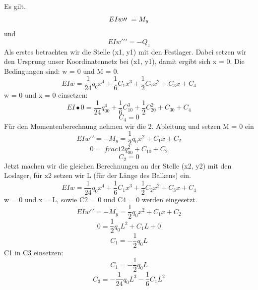 Es gilt.
\begin{equation}
	EIw\prime\prime\ =
	\-M_y
\end{equation}
und
\begin{equation}
	EIw\prime\prime\prime=
	-Q_z
\end{equation}
Als erstes betrachten wir die Stelle (x1, y1) mit den Festlager.
Dabei setzen wir den Ursprung unser Koordinatennetz bei (x1, y1), damit ergibt sich x = 0.
Die Bedingungen sind: w = 0 und M = 0.
\begin{equation}
	EIw=
	\frac{1}{24}q_0x^4+\frac{1}{6}C_1x^3+\frac{1}{2}C_2x^2+C_3x+C_4
\end{equation}
w = 0 und x = 0 einsetzen:
\begin{equation}
	EI\bullet0=
	\frac{1}{24}q_00^4+\frac{1}{6}C_10^3+\frac{1}{2}C_20^2+C_30+C_4
\end{equation}
\begin{equation}
	C_4=
	0
\end{equation}
Für den Momentenberechnung nehmen wir die 2. Ableitung und setzen M = 0 ein
\begin{equation}
	EIw\prime\prime=
	-M_y=
	\frac{1}{2}q_0x^2+C_1x+C_2
\end{equation}
\begin{equation}
	0=\
	frac{1}{2}q_00^2+C_10+C_2
\end{equation}
\begin{equation}
	C_2=
	0
\end{equation}
Jetzt machen wir die gleichen Berechnungen an der Stelle (x2, y2) mit den Loslager, für x2 setzen wir L (für der Länge des Balkens) ein.
\begin{equation}
	EIw=
	\frac{1}{24}q_0x^4+\frac{1}{6}C_1x^3+\frac{1}{2}C_2x^2+C_3x+C_4
\end{equation}
w = 0 und x = L, sowie C2 = 0 und C4 = 0 werden eingesetzt.
\begin{equation}
	EIw\prime\prime=
	-M_y=\frac{1}{2}q_0x^2+C_1x+C_2
\end{equation}
\begin{equation}
	0=
	\frac{1}{2}q_0L^2+C_1L+0
\end{equation}
\begin{equation}
	C_1=
	-\frac{1}{2}q_0L
\end{equation}
C1 in C3 einsetzen:
\begin{equation}
	C_1=
	-\frac{1}{2}q_0L
\end{equation}
\begin{equation}
	C_3=
	-\frac{1}{24}q_0L^3-\frac{1}{6}C_1L^2
\end{equation}
